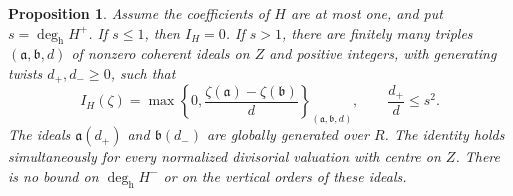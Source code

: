 \documentclass[11pt,reqno]{amsart}
\numberwithin{equation}{section}
\newtheorem{proposition}[theorem]{Proposition}
\theoremstyle{definition}
\theoremstyle{remark}
\newcommand{\degh}{\deg_{\mathrm h}}
\newcommand{\ba}{\mathfrak a}
\newcommand{\bb}{\mathfrak b}
\begin{document}
\begin{proposition}\label{prop:ideals}
Assume the coefficients of $H$ are at most one, and put $s=\degh H^+$. If $s\le1$, then $I_H=0$. If $s>1$, there are finitely many triples $(\ba,\bb,d)$ of nonzero coherent ideals on $Z$ and positive integers, with generating twists $d_+,d_-\ge0$, such that
\begin{equation}\label{eq:idealformula}
 I_H(\zeta)=\max\left\{0,
 \frac{\zeta(\ba)-\zeta(\bb)}d\right\}_{(\ba,\bb,d)},
 \qquad \frac{d_+}d\le s^2.
\end{equation}
The ideals $\ba(d_+)$ and $\bb(d_-)$ are globally generated over $R$. The identity holds simultaneously for every normalized divisorial valuation with centre on $Z$. There is no bound on $\degh H^-$ or on the vertical orders of these ideals.
\end{proposition}
\end{document}
